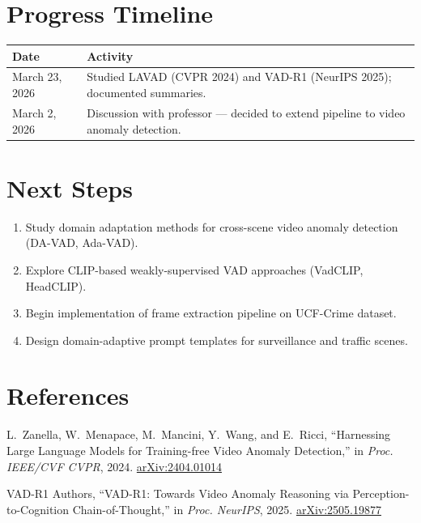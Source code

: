 \documentclass[12pt, a4paper]{article}
\begin{document}
\section{Progress Timeline}

\begin{table}[h!]
\centering
\renewcommand{\arraystretch}{1.3}
\begin{tabularx}{\textwidth}{@{}l X@{}}
    \toprule
    \textbf{Date} & \textbf{Activity} \\
    \midrule
    March 23, 2026 & Studied LAVAD (CVPR 2024) and VAD-R1 (NeurIPS 2025); documented summaries. \\
    March 2, 2026  & Discussion with professor --- decided to extend pipeline to video anomaly detection. \\
    \bottomrule
\end{tabularx}
\end{table}

\section{Next Steps}

\begin{enumerate}[leftmargin=1.5em]
    \item Study domain adaptation methods for cross-scene video anomaly detection (DA-VAD, Ada-VAD).
    \item Explore CLIP-based weakly-supervised VAD approaches (VadCLIP, HeadCLIP).
    \item Begin implementation of frame extraction pipeline on UCF-Crime dataset.
    \item Design domain-adaptive prompt templates for surveillance and traffic scenes.
\end{enumerate}

\vspace{1em}
\section{References}

\begin{enumerate}[label={[\arabic*]}, leftmargin=2em]
    \item L.~Zanella, W.~Menapace, M.~Mancini, Y.~Wang, and E.~Ricci, ``Harnessing Large Language Models for Training-free Video Anomaly Detection,'' in \textit{Proc. IEEE/CVF CVPR}, 2024. \href{https://arxiv.org/abs/2404.01014}{arXiv:2404.01014}
    
    \item VAD-R1 Authors, ``VAD-R1: Towards Video Anomaly Reasoning via Perception-to-Cognition Chain-of-Thought,'' in \textit{Proc. NeurIPS}, 2025. \href{https://arxiv.org/abs/2505.19877}{arXiv:2505.19877}
\end{enumerate}
\end{document}
